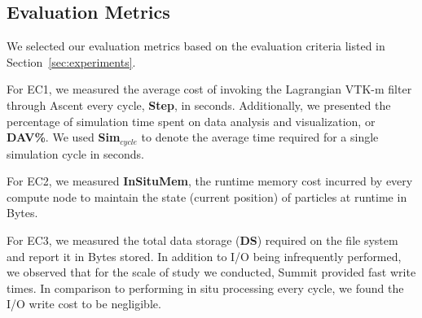 %


\vspace{-1mm}
\subsection{Evaluation Metrics}
\label{sec:metrics}
We selected our evaluation metrics based on the evaluation criteria listed in Section~\ref{sec:experiments}.
%

For EC1, we measured the average cost of invoking the Lagrangian VTK-m filter through Ascent every cycle, \textbf{Step}, in seconds. Additionally, we presented the percentage of simulation time spent on data analysis and visualization, or \textbf{DAV\%}.
%
We used \textbf{Sim$_{cycle}$} to denote the average time required for a single simulation cycle in seconds.

For EC2, we measured \textbf{InSituMem}, the runtime memory cost incurred by every compute node to maintain the state (current position) of particles at runtime in Bytes.
%

For EC3, we measured the total data storage (\textbf{DS}) required on the file system and report it in Bytes stored.
%
%
In addition to I/O being infrequently performed, we observed that for the scale of study we conducted, Summit provided fast write times.
%
In comparison to performing in situ processing every cycle, we found the I/O write cost to be negligible. %

